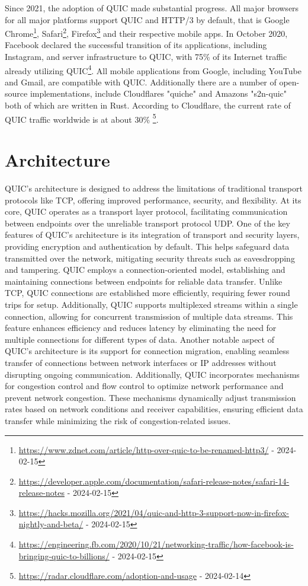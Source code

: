 Since 2021, the adoption of QUIC made substantial progress. All major browsers for all major platforms support QUIC and HTTP/3 by default, that is Google Chrome\footnote{\url{https://www.zdnet.com/article/http-over-quic-to-be-renamed-http3/} - 2024-02-15}, Safari\footnote{\url{https://developer.apple.com/documentation/safari-release-notes/safari-14-release-notes} - 2024-02-15}, Firefox\footnote{\url{https://hacks.mozilla.org/2021/04/quic-and-http-3-support-now-in-firefox-nightly-and-beta/} - 2024-02-15} and their respective mobile apps. In October 2020, Facebook declared the successful transition of its applications, including Instagram, and server infrastructure to QUIC, with 75\% of its Internet traffic already utilizing QUIC\footnote{\url{https://engineering.fb.com/2020/10/21/networking-traffic/how-facebook-is-bringing-quic-to-billions/} - 2024-02-15}. All mobile applications from Google, including YouTube and Gmail, are compatible with QUIC. Additionally there are a number of open-source implementations, include Cloudflares "quiche" and Amazons "s2n-quic" both of which are written in Rust. According to Cloudflare, the current rate of QUIC traffic worldwide is at about 30\% \footnote{\url{https://radar.cloudflare.com/adoption-and-usage} - 2024-02-14}.

\section{Architecture}

QUIC's architecture is designed to address the limitations of traditional transport protocols like TCP, offering improved performance, security, and flexibility. At its core, QUIC operates as a transport layer protocol, facilitating communication between endpoints over the unreliable transport protocol UDP. One of the key features of QUIC's architecture is its integration of transport and security layers, providing encryption and authentication by default. This helps safeguard data transmitted over the network, mitigating security threats such as eavesdropping and tampering. QUIC employs a connection-oriented model, establishing and maintaining connections between endpoints for reliable data transfer. Unlike TCP, QUIC connections are established more efficiently, requiring fewer round trips for setup. Additionally, QUIC supports multiplexed streams within a single connection, allowing for concurrent transmission of multiple data streams. This feature enhances efficiency and reduces latency by eliminating the need for multiple connections for different types of data. Another notable aspect of QUIC's architecture is its support for connection migration, enabling seamless transfer of connections between network interfaces or IP addresses without disrupting ongoing communication. Additionally, QUIC incorporates mechanisms for congestion control and flow control to optimize network performance and prevent network congestion. These mechanisms dynamically adjust transmission rates based on network conditions and receiver capabilities, ensuring efficient data transfer while minimizing the risk of congestion-related issues.

